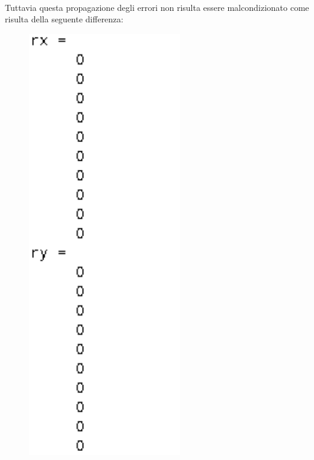 \begin{flushleft}
\begin{figure}[h]
\end{figure}
\newline \\
Tuttavia questa propagazione degli errori non risulta essere malcondizionato come risulta della seguente differenza:
\begin{figure}[h]
\includegraphics[left, width=250px]{cap_3/es16/es316b}
\end{figure}
\end{flushleft}
